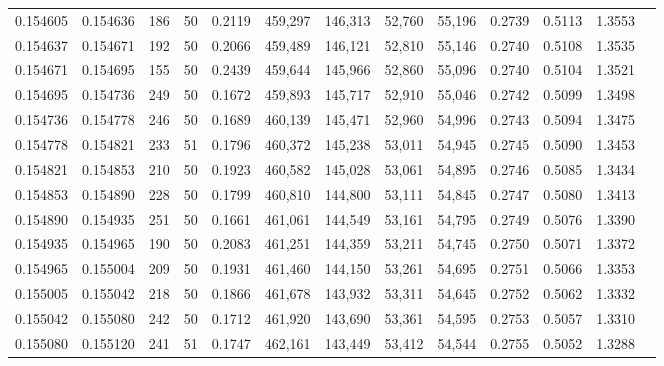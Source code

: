 \begin{tabular}{rrrrrrrrrrrrr}
0.154605 & 0.154636 &   186 &  50 &                                     0.2119 & 459,297 & 146,313 &  52,760 &  55,196 & 0.2739 & 0.5113 & 1.3553 \\
0.154637 & 0.154671 &   192 &  50 &                                     0.2066 & 459,489 & 146,121 &  52,810 &  55,146 & 0.2740 & 0.5108 & 1.3535 \\
0.154671 & 0.154695 &   155 &  50 &                                     0.2439 & 459,644 & 145,966 &  52,860 &  55,096 & 0.2740 & 0.5104 & 1.3521 \\
0.154695 & 0.154736 &   249 &  50 &                                     0.1672 & 459,893 & 145,717 &  52,910 &  55,046 & 0.2742 & 0.5099 & 1.3498 \\
0.154736 & 0.154778 &   246 &  50 &                                     0.1689 & 460,139 & 145,471 &  52,960 &  54,996 & 0.2743 & 0.5094 & 1.3475 \\
0.154778 & 0.154821 &   233 &  51 &                                     0.1796 & 460,372 & 145,238 &  53,011 &  54,945 & 0.2745 & 0.5090 & 1.3453 \\
0.154821 & 0.154853 &   210 &  50 &                                     0.1923 & 460,582 & 145,028 &  53,061 &  54,895 & 0.2746 & 0.5085 & 1.3434 \\
0.154853 & 0.154890 &   228 &  50 &                                     0.1799 & 460,810 & 144,800 &  53,111 &  54,845 & 0.2747 & 0.5080 & 1.3413 \\
0.154890 & 0.154935 &   251 &  50 &                                     0.1661 & 461,061 & 144,549 &  53,161 &  54,795 & 0.2749 & 0.5076 & 1.3390 \\
0.154935 & 0.154965 &   190 &  50 &                                     0.2083 & 461,251 & 144,359 &  53,211 &  54,745 & 0.2750 & 0.5071 & 1.3372 \\
0.154965 & 0.155004 &   209 &  50 &                                     0.1931 & 461,460 & 144,150 &  53,261 &  54,695 & 0.2751 & 0.5066 & 1.3353 \\
0.155005 & 0.155042 &   218 &  50 &                                     0.1866 & 461,678 & 143,932 &  53,311 &  54,645 & 0.2752 & 0.5062 & 1.3332 \\
0.155042 & 0.155080 &   242 &  50 &                                     0.1712 & 461,920 & 143,690 &  53,361 &  54,595 & 0.2753 & 0.5057 & 1.3310 \\
0.155080 & 0.155120 &   241 &  51 &                                     0.1747 & 462,161 & 143,449 &  53,412 &  54,544 & 0.2755 & 0.5052 & 1.3288 \\

\end{tabular}

